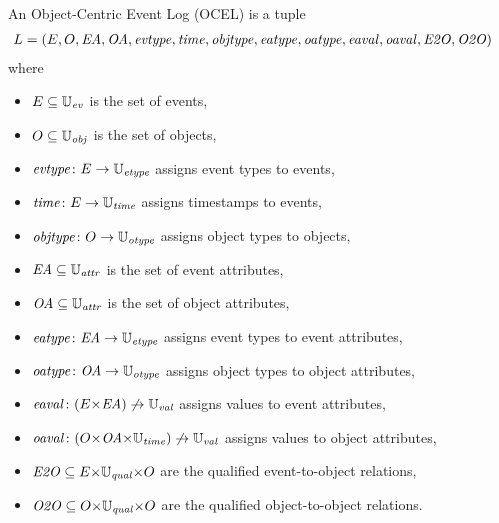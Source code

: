 \begin{definition}
  An Object-Centric Event Log (OCEL) is a tuple
  \begin{align*}
    L &= (E,O,\mathit{EA},\mathit{OA},\mathit{evtype},\mathit{time},\mathit{objtype},\mathit{eatype},\mathit{oatype},\mathit{eaval},\mathit{oaval},\mathit{E2O},\mathit{O2O})
  \end{align*}
  where
  \begin{itemize}
    \item $E\subseteq\mathbb{U}_{\mathit{ev}}$ is the set of events,
    \item $O\subseteq\mathbb{U}_{\mathit{obj}}$ is the set of objects,
    \item $\mathit{evtype}\colon E \to \mathbb{U}_{\mathit{etype}}$ assigns event types to events,
    \item $\mathit{time}\colon E \to \mathbb{U}_{\mathit{time}}$ assigns timestamps to events,
    \item $\mathit{objtype}\colon O \to \mathbb{U}_{\mathit{otype}}$ assigns object types to objects,
    \item $\mathit{EA}\subseteq\mathbb{U}_{\mathit{attr}}$ is the set of event attributes,
    \item $\mathit{OA}\subseteq\mathbb{U}_{\mathit{attr}}$ is the set of object attributes,
    \item $\mathit{eatype}\colon \mathit{EA} \to \mathbb{U}_{\mathit{etype}}$ assigns event types to event attributes,
    \item $\mathit{oatype}\colon \mathit{OA} \to \mathbb{U}_{\mathit{otype}}$ assigns object types to object attributes,
    \item $\mathit{eaval}\colon(E {\times} \mathit{EA}) \not\to \mathbb{U}_{\mathit{val}}$ assigns values to event attributes,
    \item $\mathit{oaval}\colon(O {\times} \mathit{OA} {\times} \mathbb{U}_{\mathit{time}}) \not\to \mathbb{U}_{\mathit{val}}$ assigns values to object attributes,
    \item $\mathit{E2O} \subseteq E {\times} \mathbb{U}_{\mathit{qual}} {\times} O$ are the qualified event-to-object relations,
    \item $\mathit{O2O} \subseteq O {\times} \mathbb{U}_{\mathit{qual}} {\times} O$ are the qualified object-to-object relations.
  \end{itemize}
  \label{def:ocel}
\end{definition}

